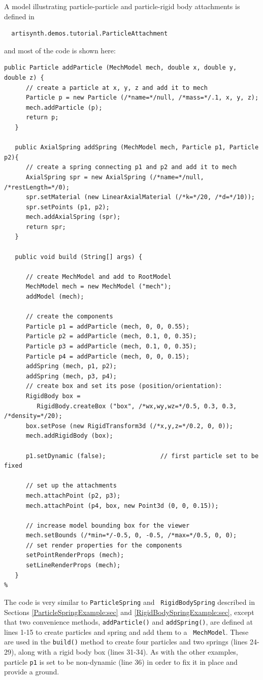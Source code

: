 A model illustrating particle-particle and particle-rigid body attachments
is defined in
%
\begin{verbatim}
  artisynth.demos.tutorial.ParticleAttachment
\end{verbatim}
%
and most of the code is shown here:
%
\lstset{numbers=left}
\begin{lstlisting}[]
   public Particle addParticle (MechModel mech, double x, double y, double z) {
      // create a particle at x, y, z and add it to mech
      Particle p = new Particle (/*name=*/null, /*mass=*/.1, x, y, z);
      mech.addParticle (p);
      return p;
   }

   public AxialSpring addSpring (MechModel mech, Particle p1, Particle p2){
      // create a spring connecting p1 and p2 and add it to mech
      AxialSpring spr = new AxialSpring (/*name=*/null, /*restLength=*/0);
      spr.setMaterial (new LinearAxialMaterial (/*k=*/20, /*d=*/10));
      spr.setPoints (p1, p2);
      mech.addAxialSpring (spr);
      return spr;
   }

   public void build (String[] args) {

      // create MechModel and add to RootModel
      MechModel mech = new MechModel ("mech");
      addModel (mech);

      // create the components
      Particle p1 = addParticle (mech, 0, 0, 0.55);
      Particle p2 = addParticle (mech, 0.1, 0, 0.35);
      Particle p3 = addParticle (mech, 0.1, 0, 0.35);
      Particle p4 = addParticle (mech, 0, 0, 0.15);
      addSpring (mech, p1, p2);
      addSpring (mech, p3, p4);
      // create box and set its pose (position/orientation):
      RigidBody box =
         RigidBody.createBox ("box", /*wx,wy,wz=*/0.5, 0.3, 0.3, /*density=*/20);
      box.setPose (new RigidTransform3d (/*x,y,z=*/0.2, 0, 0));
      mech.addRigidBody (box);

      p1.setDynamic (false);               // first particle set to be fixed

      // set up the attachments
      mech.attachPoint (p2, p3);
      mech.attachPoint (p4, box, new Point3d (0, 0, 0.15));

      // increase model bounding box for the viewer
      mech.setBounds (/*min=*/-0.5, 0, -0.5, /*max=*/0.5, 0, 0);  
      // set render properties for the components
      setPointRenderProps (mech);
      setLineRenderProps (mech);
   }
%
\end{lstlisting}
\lstset{numbers=none}

The code is very similar to {\tt ParticleSpring} and {\tt
RigidBodySpring} described in Sections \ref{ParticleSpringExample:sec}
and \ref{RigidBodySpringExample:sec}, except that two convenience
methods, {\tt addParticle()} and {\tt addSpring()}, are defined at
lines 1-15 to create particles and spring and add them to a {\tt
MechModel}. These are used in the {\tt build()} method to create four
particles and two springs (lines 24-29), along with a rigid body box
(lines 31-34). As with the other examples, particle {\tt p1} is set to
be non-dynamic (line 36) in order to fix it in place and provide a
ground.

